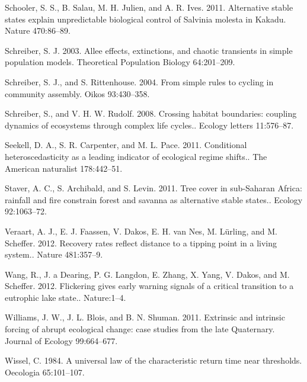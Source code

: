 \documentclass{article}
\begin{document}
Schooler, S. S., B. Salau, M. H. Julien, and A. R. Ives. 2011.
Alternative stable states explain unpredictable biological control of
Salvinia molesta in Kakadu. Nature 470:86--89.

Schreiber, S. J. 2003. Allee effects, extinctions, and chaotic
transients in simple population models. Theoretical Population Biology
64:201--209.

Schreiber, S. J., and S. Rittenhouse. 2004. From simple rules to cycling
in community assembly. Oikos 93:430--358.

Schreiber, S., and V. H. W. Rudolf. 2008. Crossing habitat boundaries:
coupling dynamics of ecosystems through complex life cycles.. Ecology
letters 11:576--87.

Seekell, D. A., S. R. Carpenter, and M. L. Pace. 2011. Conditional
heteroscedasticity as a leading indicator of ecological regime shifts..
The American naturalist 178:442--51.

Staver, A. C., S. Archibald, and S. Levin. 2011. Tree cover in
sub-Saharan Africa: rainfall and fire constrain forest and savanna as
alternative stable states.. Ecology 92:1063--72.

Veraart, A. J., E. J. Faassen, V. Dakos, E. H. van Nes, M. Lürling, and
M. Scheffer. 2012. Recovery rates reflect distance to a tipping point in
a living system.. Nature 481:357--9.

Wang, R., J. a Dearing, P. G. Langdon, E. Zhang, X. Yang, V. Dakos, and
M. Scheffer. 2012. Flickering gives early warning signals of a critical
transition to a eutrophic lake state.. Nature:1--4.

Williams, J. W., J. L. Blois, and B. N. Shuman. 2011. Extrinsic and
intrinsic forcing of abrupt ecological change: case studies from the
late Quaternary. Journal of Ecology 99:664--677.

Wissel, C. 1984. A universal law of the characteristic return time near
thresholds. Oecologia 65:101--107.
\end{document}
